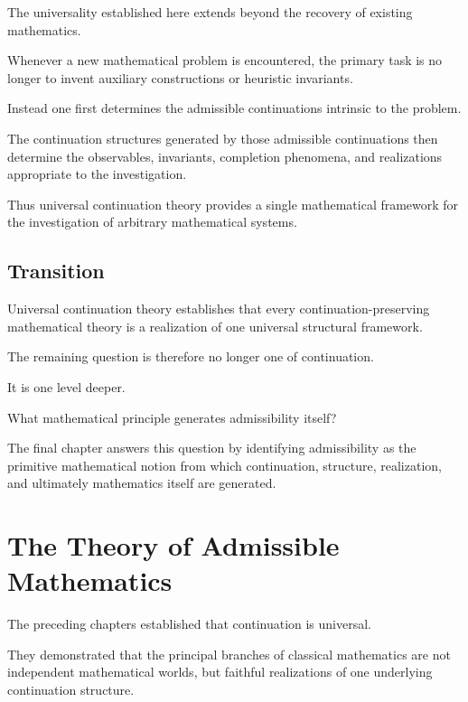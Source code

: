 \documentclass[13pt,openany]{book}
\theoremstyle{plain}
\theoremstyle{definition}
\begin{document}
The universality established here extends beyond the recovery of existing
mathematics.

Whenever a new mathematical problem is encountered, the primary task is no
longer to invent auxiliary constructions or heuristic invariants.

Instead one first determines the admissible continuations intrinsic to the
problem.

The continuation structures generated by those admissible continuations then
determine the observables, invariants, completion phenomena, and realizations
appropriate to the investigation.

Thus universal continuation theory provides a single mathematical framework for
the investigation of arbitrary mathematical systems.

\section{Transition}

Universal continuation theory establishes that every continuation-preserving
mathematical theory is a realization of one universal structural framework.

The remaining question is therefore no longer one of continuation.

It is one level deeper.

What mathematical principle generates admissibility itself?

The final chapter answers this question by identifying admissibility as the
primitive mathematical notion from which continuation, structure, realization,
and ultimately mathematics itself are generated.

\chapter{The Theory of Admissible Mathematics}


The preceding chapters established that continuation is universal.

They demonstrated that the principal branches of classical mathematics are not
independent mathematical worlds, but faithful realizations of one underlying
continuation structure.
\end{document}
